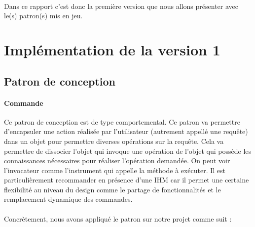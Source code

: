 \documentclass[a4paper,11pt]{article}
\begin{document}
\paragraph{}
Dans ce rapport c'est donc la première version que nous allons présenter avec le(s) patron(s) mis en jeu.

\section{Implémentation de la version 1}


\subsection{Patron de conception}



\paragraph{Commande} Ce patron de conception est de type comportemental. Ce patron va permettre d'encapsuler une action réalisée par l'utilisateur (autrement appellé une requête)  dans un objet pour permettre diverses opérations sur la requête. Cela va permettre de dissocier l'objet qui invoque une opération de l'objet qui possède les connaissances nécessaires pour réaliser l'opération demandée. On peut voir l'invocateur comme l'instrument qui appelle la méthode à exécuter. Il est particulièrement recommander en présence d'une IHM car il permet une certaine flexibilité au niveau du design comme le partage de fonctionnalités et le remplacement dynamique des commandes.

\paragraph{}

Concrètement, nous avons appliqué le patron sur notre projet comme suit : \\
\end{document}
